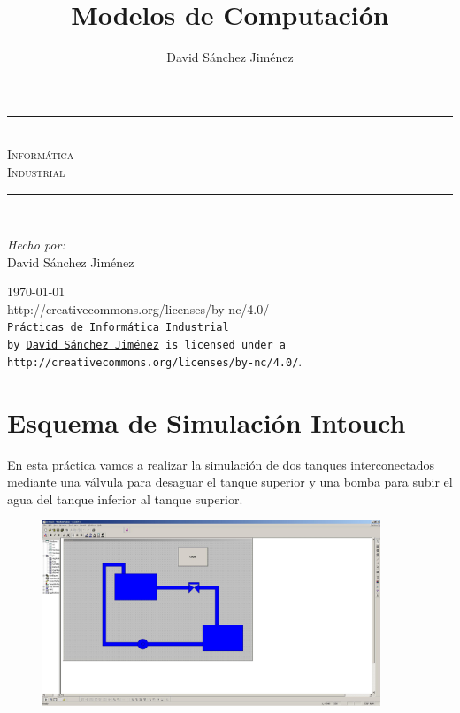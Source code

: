 \documentclass[10pt,a4paper,spanish]{report}
\title{Modelos de Computación}
\author{David Sánchez Jiménez}
\newcommand{\HRule}{\rule{\linewidth}{0.5mm}} %
\begin{document}
\begin{titlepage}
	\begin{center}
		\HRule \\[0.8cm]
		\textsc{\huge Informática\\[0.5cm] Industrial}\\[1.6cm]
		\HRule \\[1cm]
		\begin{flushleft}
			\emph{Hecho por:}\\
			David Sánchez Jiménez
		\end{flushleft}
		\vspace{12cm}
		\large{\today}\\
		\vspace{0.5cm}
		{http://creativecommons.org/licenses/by-nc/4.0/}\\[0.5cm]
		\texttt{Prácticas de Informática Industrial\\ by
			\href{mailto:dasaji92@gmail.com}{David Sánchez Jiménez} is licensed under a 
			{http://creativecommons.org/licenses/by-nc/4.0/}}.\\[3mm]
	\end{center}
\end{titlepage}

\tableofcontents
\newpage

\chapter{Esquema de Simulación Intouch}

\noindent
En esta práctica vamos a realizar la simulación de dos tanques interconectados mediante una válvula para desaguar el tanque superior y una bomba para subir el agua del tanque inferior al tanque superior.

\begin{figure}[!hbp]
	\centering  \includegraphics[width=0.9\textwidth]{Imagenes/p1.JPG}
\end{figure}
\end{document}

